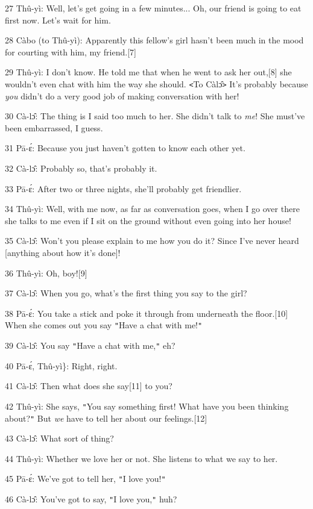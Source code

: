 {27 Thû-yì: Well, let's get going in a few minutes... Oh, our friend is
going to eat first now. Let's wait for him.}

{28  Càbo (to Thû-yì): Apparently this fellow's girl hasn't been much
in the mood for courting with him, my friend.[7]}

{29 Thû-yì: I don't know. He told me that when he went to ask her out,[8]
she wouldn't even chat with him the way she should. \texttt{<}To Càlɔ̂\texttt{>}
It's probably because }{\textit{you}}{ didn't do a very good job
of making conversation with her! }

{30 Cà-lɔ̂: The thing is I said too much to her. She didn't talk to}{\textit{
me}}{! She must've been embarrassed, I guess.}

{31 Pā-ɛ́: Because you just haven't gotten to know each other yet.}

{32 Cà-lɔ̂: Probably so, that's probably it.}

{33 Pā-ɛ́: After two or three nights, she'll probably get friendlier.}

{34 Thû-yì: Well, with me now, as far as conversation goes, when I go
over there she talks to me even if I sit on the ground without even going into
her house!}

{35 Cà-lɔ̂: Won't you please explain to me how you do it? Since I've
never heard [anything about how it's done]!}

{36 Thû-yì: Oh, boy![9]}

{37 Cà-lɔ̂: When you go, what's the first thing you say to the girl?}

{38 Pā-ɛ́: You take a stick and poke it through from underneath the
floor.[10] When she comes out you say \texttt{"}Have a chat with me!\texttt{"}}

{39 Cà-lɔ̂: You say \texttt{"}Have a chat with me,\texttt{"} eh?}

{40 Pā-ɛ́, Thû-yì\}: Right, right.}

{41 Cà-lɔ̂: Then what does she say[11] to you?}

{42 Thû-yì: She says, \texttt{"}You say something first! What have you
been thinking about?\texttt{"} But }{\textit{we}}{ have to tell her
about our feelings.[12]}

{43 Cà-lɔ̂: What sort of thing?}

{44 Thû-yì: Whether we love her or not. She listens to what we say to
her. }

{45 Pā-ɛ́: We've got to tell her, \texttt{"}I love you!\texttt{"}}

{46 Cà-lɔ̂: You've got to say, \texttt{"}I love you,\texttt{"} huh?}


